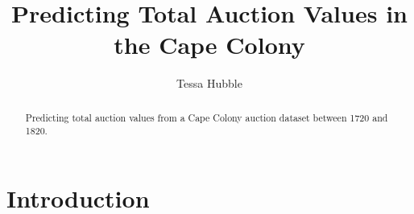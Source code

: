 \documentclass[11pt,preprint, authoryear]{elsarticle}
\numberwithin{equation}{section}
\numberwithin{figure}{section}
\numberwithin{table}{section}
\begin{document}
\begin{frontmatter}  %

\title{Predicting Total Auction Values in the Cape Colony}





\author[Add1]{Tessa Hubble}





\address[Add1]{Stellenbosch University, South Africa}


\begin{abstract}
\small{
Predicting total auction values from a Cape Colony auction dataset
between 1720 and 1820.
}
\end{abstract}

\vspace{1cm}





\vspace{0.5cm}

\end{frontmatter}

\setcounter{footnote}{0}



\pagestyle{fancy}
\chead{}
\rhead{}
\lfoot{}
\lhead{}
\cfoot{}


\headsep 35pt %




\hypertarget{introduction}{%
\section{\texorpdfstring{Introduction
\label{Introduction}}{Introduction }}\label{introduction}}
\end{document}
